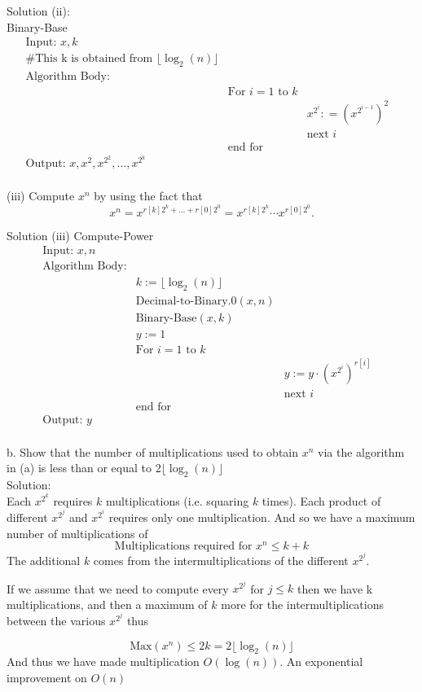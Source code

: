 \documentclass[16 pt]{amsart}
\theoremstyle{definition}
\theoremstyle{remark}
\numberwithin{equation}{subsection}
\begin{document}
Solution (ii):\\
Binary-Base
\[
\begin{array}{llll}
\text{Input: } x,k &&&\\
\text{\# This k is obtained from } \lfloor \log_2(n) \rfloor&&&\\
\text{Algorithm Body:} &&&\\
& \text{For } i=1 \text{ to } k && \\
& & x^{2^i} : = (x^{2^{i-1}})^2 & \\
& & \text{next } i & \\
& \text{end for} && \\
\text{Output: } x,x^2,x^{2^2},\dots, x^{2^k} &&& \\
\end{array}
\]

\vspace{1in}

(iii) Compute  $x^n$ by using the fact that
\[
x^n = x^{r[k]2^k + \dots + r[0]2^0} = x^{r[k]2^k}\cdots x^{r[0]2^0}.
\]


Solution (iii)
Compute-Power
\[
\begin{array}{llll}
\text{Input: } x,n &&&\\
\text{Algorithm Body:} &&&\\
& k:= \lfloor \log_2(n)\rfloor &&\\
& \text{Decimal-to-Binary.0}(x,n) && \\
& \text{Binary-Base}(x,k) && \\
& y:=1 & & \\
& \text{For } i=1 \text{ to } k && \\
&& y:= y\cdot (x^{2^i})^{r[i]} & \\
&& \text{next } i &\\
&\text{end for} &&\\
\text{Output: } y &&& \\
\end{array}
\]


\vspace{1in}

b. Show that the number of multiplications used to obtain $x^n$ via the algorithm in (a) is less than or equal to $2\lfloor\log_2(n)\rfloor$\\

Solution:\\
Each $x^{2^k}$ requires $k$ multiplications (i.e. squaring $k$ times).  Each product of different $x^{2^j}$ and $x^{2^i}$ requires only one multiplication.  And so we have a maximum number of multiplications of
\[
\text{Multiplications required for } x^n \leq k + k
\]
The additional $k$ comes from the intermultiplications of the different $x^{2^j}$.

If we assume that we need to compute every $x^{2^j}$ for $j\leq k$ then we have k multiplications, and then a maximum of $k$ more for the intermultiplications between the various $x^{2^j}$ thus

\[
\text{Max}(x^n) \leq 2k = 2\lfloor \log_2(n)\rfloor 
\] 
And thus we have made multiplication $O(\log(n))$.  An exponential improvement on $O(n)$
\end{document}
